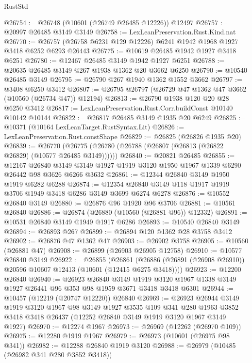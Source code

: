 \begin{lexlean}{RustStd}
\begin{coremodule}
@26754 := @26748 (@10601 (@26749 @26485 @12226)) @12497
@26757 := @20997 @26485 @3149 @3149
@26758 := LexLeanPreservation.Rust.Kind.nat
@26770 := @26757 (@26758 @6231 @129 @12226) @6241 @1942 @1968 @1927 @3418 @6252 @6293 @26443
@26775 := @10619 @26485 @1942 @1927 @3418 @6251
@26780 := @12467 @26485 @3149 @1942 @1927 @6251
@26788 := @20635 @26485 @3149 @267 @1938 @1362 @20 @3662 @6250
@26790 := @10540 @26485 @3149
@26795 := @26790 @267 @1940 @1362 @1552 @3662
@26797 := @3408 @6250 @3412
@26807 := @26795 @26797 (@26729 @47 @1362 @47 @3662 (@10560 (@26734 @47)) @12194)
@26813 := @26790 @1938 @120 @20 @28 @6250 @3412
@26817 := LexLeanPreservation.Rust.Corr.buildConst @10140 @10142 @10144
@26822 := @26817 @26485 @3149 @1935 @20 @6249
@26825 := @10371 (@10164 LexLeanTarget.RustSyntax.Lit)
@26826 := LexLeanPreservation.Rust.constShape
@26829 := @26825 (@26826 @1935 @20)
@26839 := @26770 (@26775 (@26780 (@26788 (@26807 (@26813 (@26822 @26829) (@10577 @26485 @3149))))))
@26840 := @20821 @26485
@26855 := @12167
    @26840
    @3149
    @3149
    @1927
    @1919
    @3120
    @1950
    @1967
    @1339
    @6290
    @26442
    @98
    @3626
    @6266
    @3632
@26861 := @12344 @26840 @3149 @1950 @1919 @6282 @6288
@26874 := @12354 @26840 @3149 @118 @1917 @1919 @3706 @1949 @3418 @6286 @3149 @3699 @6274 @6278
@26876 := @10552 @26840 @3149
@26880 := @26876 @96 @1920 @96 @3706
@26881 := @10561 @26840
@26886 := @26874 (@26880 (@10560 (@26881 @96)) @12332)
@26891 := @10531 @26840 @3149 @1949 @1917 @6286
@26893 := @10540 @26840 @3149
@26894 := @26893 @267
@26899 := @26894 @120 @1362 @28 @3758 @3412
@26902 := @26876 @47 @1362 @47
@26903 := @26902 @3758
@26905 := @10560 (@26881 @47)
@26908 := @26899 (@26903 @26905 @12758)
@26910 := @10577 @26840 @3149
@26922 := @26855
    (@26861 (@26886 (@26891 (@26908 @26910)) @20596 @10607 @12413 (@10601 (@12415 @6275 @3418))))
@26923 := @12200 @26840
@26940 := @26923
    @26840
    @3149
    @1919
    @3120
    @1967
    @1338
    @3149
    @1927
    @26441
    @96
    @353
    @98
    @1959
    @3671
    @3418
    @3418
    @6301
@26944 := @10457 (@12219 (@20747 @12220)) @26840
@26969 := @26923
    @26944
    @3149
    @1919
    @3120
    @1967
    @98
    @3149
    @1927
    @3535
    @109
    @341
    @280
    @1963
    @3852
    @3418
    @3418
    @26437
    (@12252 @26840 @3149 @1919 @3120 @1967 @3149 @1927)
@26970 := @12274 @1967
@26973 := @26969 (@12262 (@26970 @109))
@26975 := @12280 @1919 @1967
@26979 := @26973 (@10601 (@26975 @98 @341))
@26982 := @12288 @26840 @1919 @3120
@26988 := @26979 (@10485 (@26982 @341 @280 @3852 @3418))

\end{coremodule}
\end{lexlean}
